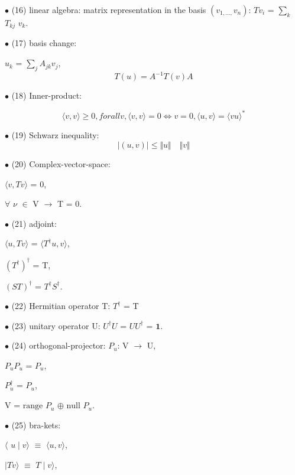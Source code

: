 \documentclass[a4paper, 10pt, onepage]{elegantbook}
\begin{document}
{$\bullet$ (16) linear algebra: matrix representation in the basis 
$(v_{1,...,}v_n)$: $Tv_i$ = $\sum_k $ $T_{kj}$ $v_k$.  

$\bullet$ (17) basis change:  

$u_k$ = $\sum_j A_{jk}v_j$,
\begin{equation}
T({u}) = A^{-1} T ({v}) A
\end{equation}

$\bullet$ (18) Inner-product:  

\begin{equation} \label{eq:Inner-Product}
\langle{v,v} \rangle \geq 0, for all v, \langle{v,v} \rangle = 0 \iff v = 0, \langle{u,v} \rangle = \langle{vu} 
\rangle^*
\end{equation}

$\bullet$ (19) Schwarz inequality:  
\begin{equation}
\mid (u,v) \mid \leq \Vert u \Vert \quad  \Vert v \Vert
\end{equation}

$\bullet$ (20) Complex-vector-space:  

$\langle v,Tv \rangle$ = 0,  

$\forall$ $\nu$ $\in$ V $\longrightarrow$ T = 0.  

$\bullet$ (21) adjoint: 

$\langle{u,Tv} \rangle$ = $\langle T^\dagger{u,v} \rangle$,  

$(T^\dagger)^\dagger$ = T,  

$(ST)^\dagger$ = $T^\dagger S^\dagger$. 

$\bullet$ (22) Hermitian operator T: $T^\dagger$ = T 

$\bullet$ (23) unitary operator U: $U^\dagger U$ = $UU^\dagger$ = $\mathbf{1}$.  

$\bullet$ (24) orthogonal-projector: $P_u$: V $\longrightarrow$ U,  

${P_uP_u}$ = $P_u$, 

$P_u^\dagger$ = $P_u$,  

V  = $\text{range}$ $P_u$ $\oplus$ $\text{null}$ $P_u$. 

$\bullet$ (25) bra-kets:

$\langle$ $u \mid v \rangle$ $\equiv$ $\langle { u,v} \rangle$,  

$\mid Tv \rangle$ $\equiv$ $T \mid v \rangle$,  

}
\end{document}
